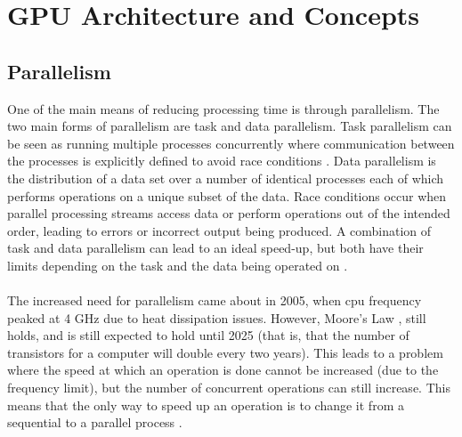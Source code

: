 \section{GPU Architecture and Concepts}\label{gpu}
\subsection{Parallelism}\label{gpu:sec:par}
One of the main means of reducing processing time is through parallelism. The two main forms of parallelism are task and data parallelism. Task parallelism can be seen as running multiple processes concurrently where communication between the processes is explicitly defined to avoid race conditions \citep{subhlok1993exploiting}. Data parallelism is the distribution of a data set over a number of identical processes each of which performs operations on a unique subset of the data. Race conditions occur when parallel processing streams access data or perform operations out of the intended order, leading to errors or incorrect output being produced. A combination of task and data parallelism can lead to an ideal speed-up, but both have their limits depending on the task and the data being operated on \citep{subhlok1993exploiting}.
\\
\\
The increased need for parallelism came about in 2005, when \gls{cpu} frequency peaked at 4 GHz due to heat dissipation issues. However, Moore's Law \citep{moore2006cramming}, still holds, and is still expected to hold until 2025 (that is, that the number of transistors for a computer will double every two years). This leads to a problem where the speed at which an operation is done cannot be increased (due to the frequency limit), but the number of concurrent operations can still increase. This means that the only way to speed up an operation is to change it from a sequential to a parallel process \citep{rajan2013informatics}.
